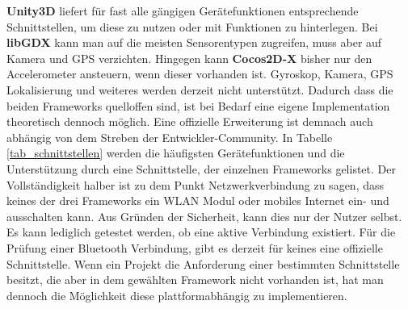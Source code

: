 \bigskip
\textbf{Unity3D} liefert für fast alle gängigen Gerätefunktionen entsprechende Schnittstellen, um diese zu nutzen oder mit Funktionen zu hinterlegen. Bei \textbf{libGDX} kann man auf die meisten Sensorentypen zugreifen, muss aber auf Kamera und GPS verzichten.
Hingegen kann \textbf{Cocos2D-X} bisher nur den Accelerometer ansteuern, wenn dieser vorhanden ist. Gyroskop, Kamera, GPS Lokalisierung und weiteres werden derzeit nicht unterstützt. Dadurch dass die beiden Frameworks quelloffen sind, ist bei Bedarf eine eigene Implementation theoretisch dennoch möglich. Eine offizielle Erweiterung ist demnach auch abhängig von dem Streben der Entwickler-Community. 
In Tabelle \ref{tab_schnittstellen} werden die häufigsten Gerätefunktionen und die Unterstützung durch eine Schnittstelle, der einzelnen Frameworks gelistet. 
Der Vollständigkeit halber ist zu dem Punkt Netzwerkverbindung zu sagen, dass keines der drei Frameworks ein WLAN Modul oder mobiles Internet ein- und ausschalten kann. Aus Gründen der Sicherheit, kann dies nur der Nutzer selbst. Es kann lediglich getestet werden, ob eine aktive Verbindung existiert. Für die Prüfung einer Bluetooth Verbindung, gibt es derzeit für keines eine offizielle Schnittstelle. Wenn ein Projekt die Anforderung einer bestimmten Schnittstelle besitzt, die aber in dem gewählten Framework nicht vorhanden ist, hat man dennoch die Möglichkeit diese plattformabhängig zu implementieren.

